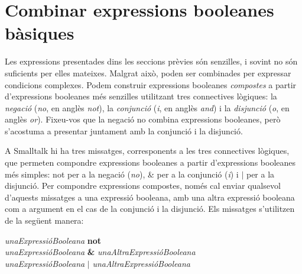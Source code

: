 \section{Combinar expressions booleanes bàsiques}
Les expressions presentades dins les seccions prèvies són senzilles, i sovint no són suficients per elles mateixes. Malgrat això, poden ser combinades per expressar condicions complexes. Podem construir expressions booleanes \emph{compostes} a partir d'expressions booleanes més senzilles utilitzant tres connectives lògiques: la \emph{negació} (\emph{no}, en anglès \emph{not}), la \emph{conjunció} (\emph{i}, en anglès \emph{and}) i la \emph{disjunció} (\emph{o}, en anglès \emph{or}). Fixeu-vos que la negació no combina expressions booleanes, però s'acostuma a presentar juntament amb la conjunció i la disjunció.

A Smalltalk hi ha tres missatges, corresponents a les tres connectives lògiques, que permeten compondre expressions booleanes a partir d'expressions booleanes més simples: \textsf{not} per a la negació (\emph{no}), \textsf{\&} per a la conjunció (\emph{i}) i \textsf{$|$} per a la disjunció. Per compondre expressions compostes, només cal enviar qualsevol d'aquests missatges a una expressió booleana, amb una altra expressió booleana com a argument en el cas de la conjunció i la disjunció. Els missatges s'utilitzen de la següent manera:     

\vspace*{2mm}
\noindent
\textsf{\upshape
{\itshape unaExpressióBooleana} {\bfseries not}\\
{\itshape unaExpressióBooleana} {\bfseries \&} {\itshape unaAltraExpressióBooleana}\\
{\itshape unaExpressióBooleana} {\bfseries $|$} {\itshape unaAltraExpressióBooleana}\\
}

